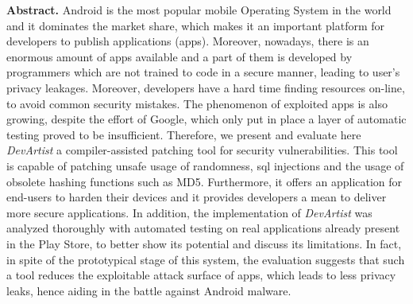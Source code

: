 \pagebreak
\hspace{0pt}
\vfill
\textbf{Abstract.}
Android is the most popular mobile Operating System in the world and it dominates the market share, which makes it an important platform for developers to publish applications (apps). Moreover, nowadays, there is an enormous amount of apps available and a part of them is developed by programmers which are not trained to code in a secure manner, leading to user's privacy leakages. Moreover, developers have a hard time finding resources on-line, to avoid common security mistakes. The phenomenon of exploited apps is also growing, despite the effort of Google, which only put in place a layer of automatic testing proved to be insufficient\cite{bouncerfail}. Therefore, we present and evaluate here \emph{DevArtist} a compiler-assisted patching tool for security vulnerabilities. This tool is capable of patching unsafe usage of randomness, sql injections and the usage of obsolete hashing functions such as MD5. Furthermore, it offers an application for end-users to harden their devices and it provides developers a mean to deliver more secure applications. In addition, the implementation of \emph{DevArtist} was analyzed thoroughly with automated testing on real applications already present in the Play Store, to better show its potential and discuss its limitations. In fact, in spite of the prototypical stage of this system, the evaluation suggests that such a tool reduces the exploitable attack surface of apps, which leads to less privacy leaks, hence aiding in the battle against Android malware.
\vfill
\hspace{0pt}
\pagebreak
